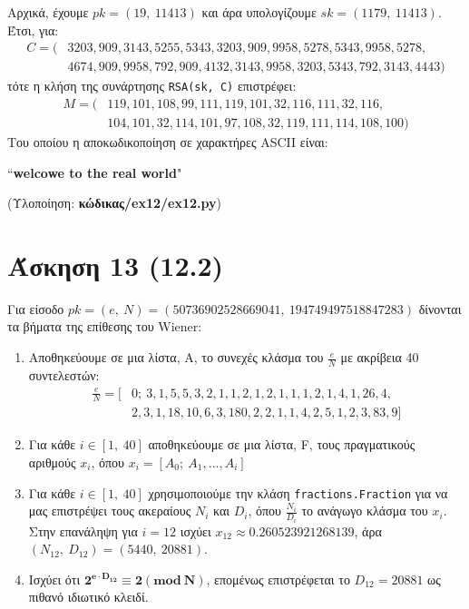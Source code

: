 \documentclass[12pt]{article}
\newcommand{\lt}{\latintext}
\begin{document}
\noindent
Αρχικά, έχουμε $pk = (19,\:11413)$ και άρα υπολογίζουμε $sk = (1179,\:11413)$. Έτσι, για:
\begin{align*}
	C = (&3203, 909, 3143, 5255, 5343,
    3203, 909, 9958, 5278, 5343, 
    9958, 5278, \\
    &4674, 909, 9958,
    792, 909, 4132, 3143, 9958,
    3203, 5343, 792, 3143, 4443)
\end{align*}
τότε η κλήση της συνάρτησης \texttt{\lt RSA(sk, C)} επιστρέφει:
\begin{align*}
M = (&119, 101, 108, 99, 111, 119, 101, 32, 116, 111, 32, 116, \\
&104, 101, 32, 114, 101, 97, 108, 32, 119, 111, 114, 108, 100)
\end{align*}
Του οποίου η αποκωδικοποίηση σε χαρακτήρες {\lt ASCII} είναι:
{ \lt
\begin{center}
	``\textbf{welcowe to the real world}"
\end{center}
}

\hfill

\vspace{0.3in}
\noindent
(Υλοποίηση: \textbf{κώδικας/{\lt ex12/ex12.py}})

\pagebreak

\section*{Άσκηση 13 (12.2)}

Για είσοδο $pk = (e,\:N) = (50736902528669041,\:194749497518847283)$ δίνονται τα βήματα 
της επίθεσης του {\lt Wiener}:
\begin{enumerate}
	\item Αποθηκεύουμε σε μια λίστα, A, το συνεχές κλάσμα του $\frac{e}{N}$ με ακρίβεια 40 συντελεστών:
	\begin{align*}
	\frac{e}{N} = [&0;\:3, 1, 5, 5, 3, 2, 1, 1, 2, 1, 2, 1, 1, 1, 2, 1, 4, 1, 26, 4, \\
	&2, 3, 1, 18, 10, 6, 3, 180, 2, 2, 1, 1, 4, 2, 5, 1, 2, 3, 83, 9]
	\end{align*}
	\item Για κάθε $i \in [1,\:40]$ αποθηκεύουμε σε μια λίστα, {\lt F}, τους πραγματικούς αριθμούς 
	$x_i$, όπου $x_i = [A_0;\:A_1, ..., A_i]$
	\item Για κάθε $i \in [1,\:40]$ χρησιμοποιούμε την κλάση \texttt{\lt fractions.Fraction} για 
	να μας επιστρέψει τους ακεραίους $N_i$ και $D_i$, όπου $\frac{N_i}{D_i}$ το ανάγωγο κλάσμα του 
	$x_i$. Στην επανάληψη για $i = 12$ ισχύει $x_{12} \approx 0.260523921268139$, άρα 
	$(N_{12},\:D_{12}) = (5440,\:20881)$.
	\item Ισχύει ότι $\mathbf{2^{e \cdot D_{12}} \equiv 2(mod\:N)}$, επομένως επιστρέφεται το 
	$D_{12} = 20881$ ως πιθανό ιδιωτικό κλειδί.
\end{enumerate}
\end{document}
